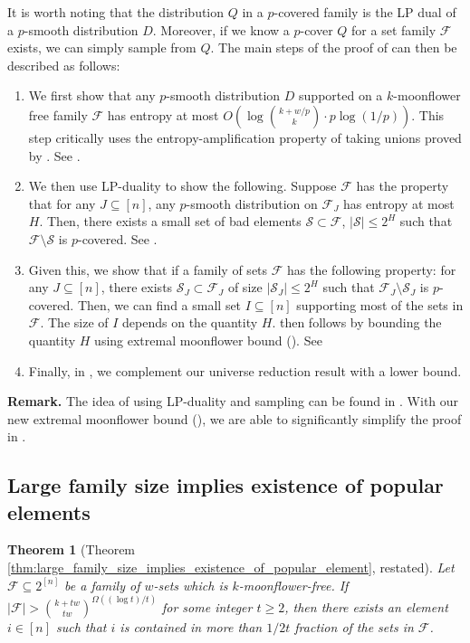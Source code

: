 \documentclass{article}
\newtheorem{theorem}{Theorem}[section]
\newcommand{\<}{\langle}
\renewcommand{\>}{\rangle}
\newcommand{\calF}{\mathcal{F}}
\newcommand{\calS}{\mathcal{S}}
\begin{document}
It is worth noting that the distribution $Q$ in a $p$-covered family is the LP dual of a $p$-smooth distribution $D$. Moreover, if we know a $p$-cover $Q$ for a set family $\calF$ exists, we can simply sample from $Q$. The main steps of the proof of  can then be described as follows:
\begin{enumerate}
    \item We first show that any $p$-smooth distribution $D$ supported on a $k$-moonflower free family $\calF$ has entropy at most $O( \log \binom{k+w/p}{k} \cdot p  \log(1/p))$. This step critically uses the entropy-amplification property of taking unions proved by \cite{Gil22, Saw23}. See . 
    \item We then use LP-duality to show the following. Suppose $\calF$ has the property that for any  $J \subseteq [n]$, any $p$-smooth distribution on $\calF_J$ has entropy at most $H$. Then, there exists a small set of bad elements $\calS \subset \calF$, $|\calS| \leq 2^H$ such that $\calF \setminus \calS$ is $p$-covered. See . 
    \item Given this, we show that if a family of sets $\calF$ has the following property: for any $J \subseteq [n]$, there exists $\calS_J \subset \calF_J$ of size $|\calS_J| \leq 2^H$ such that $\calF_J\setminus \calS_J$ is $p$-covered. Then, we can find a small set $I \subseteq [n]$ supporting most of the sets in $\calF$. The size of $I$ depends on the quantity $H$.  then follows by bounding the quantity $H$ using extremal moonflower bound (). See 
    \item Finally, in , we complement our universe reduction result with a lower bound.
\end{enumerate}

\textbf{Remark. }The idea of using LP-duality and sampling can be found in \cite{BG25}. With our new extremal moonflower bound (), we are able to significantly simplify the proof in \cite{BG25}. 

\subsection{Large family size implies existence of popular elements}\label{subsec:large_family_implies_popular}

\begin{theorem}[Theorem \ref{thm:large_family_size_implies_existence_of_popular_element}, restated]\label{lem:large_family_size_implies_existence_of_popular_element}
    Let $\calF \subseteq 2^{[n]}$ be a family of $w$-sets which is $k$-moonflower-free. If $|\calF| > {\binom{k+tw}{tw}}^{\Omega((\log t)/t)}$  for some integer $t \geq 2$, then there exists an element $i \in [n]$ such that $i$ is contained in more than $1/2t$ fraction of the sets in $\calF$. 
\end{theorem}
\end{document}
